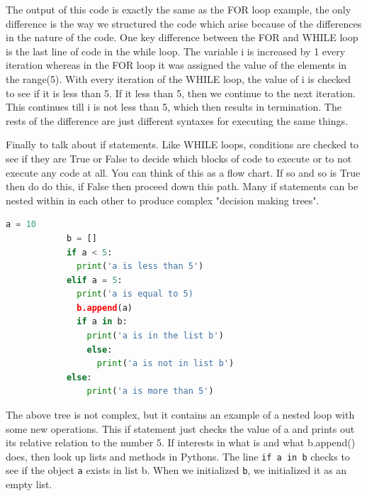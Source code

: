 \documentclass[11pt,a4paper]{book}
\begin{document}
			The output of this code is exactly the same as the FOR loop example, the only difference is the way we structured the code which arise because of the differences in the nature of the code. One key difference between the FOR and WHILE loop is the last line of code in the while loop. The variable i is increased by 1 every iteration whereas in the FOR loop it was assigned the value of the elements in the range(5). With every iteration of the WHILE loop, the value of i is checked to see if it is less than 5. If it less than 5, then we continue to the next iteration. This continues till i is not less than 5, which then results in termination. The rests of the difference are just different syntaxes for executing the same things.
			
			Finally to talk about if statements. Like WHILE loops, conditions are checked to see if they are True or False to decide which blocks of code to execute or to not execute any code at all. You can think of this as a flow chart. If so and so is True then do do this, if False then proceed down this path. Many if statements can be nested within in each other to produce complex "decision making trees".
			
			\begin{lstlisting}[language=Python, caption = Conditionals]
			a = 10
			b = []
			if a < 5:
			  print('a is less than 5')
			elif a = 5:
			  print('a is equal to 5)
			  b.append(a)
			  if a in b:
			    print('a is in the list b')
				else:
				  print('a is not in list b')
			else:
				print('a is more than 5') 
			\end{lstlisting}
			
			The above tree is not complex, but it contains an example of a nested loop with some new operations. This if statement just checks the value of a and prints out its relative relation to the number 5. If interests in what is and what b.append() does, then look up lists and methods in Pythons. The line \lstinline|if a in b| checks to see if the object \lstinline|a| exists in list b. When we initialized \lstinline|b|, we initialized it as an empty list.
\end{document}
